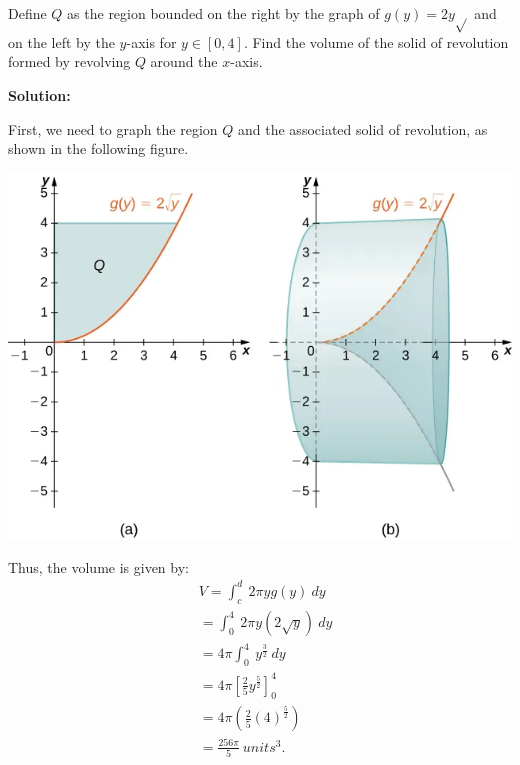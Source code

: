 \documentclass{report}
\begin{document}
  \pagebreak \bigbreak \noindent 
  \begin{eg}
     Define \( Q \) as the region bounded on the right by the graph of \( g(y) = 2y\sqrt{} \) and on the left by the \( y \)-axis for \( y \in [0, 4] \). Find the volume of the solid of revolution formed by revolving \( Q \) around the \( x \)-axis.
  \end{eg}
  \bigbreak \noindent 
  \textbf{Solution:}
  \bigbreak \noindent 
  \begin{minipage}[]{0.47\textwidth}
      First, we need to graph the region $Q$ and the associated solid of revolution, as shown in the following figure.
      \bigbreak \noindent 
      \begin{center}
          \includegraphics[scale=0.4]{./figures/graph30.png}
      \end{center}
  \end{minipage}
  \begin{minipage}[]{0.47\textwidth}
    Thus, the volume is given by:
    \begin{align*}
        &V = \int_{c}^{d}\ 2\pi yg(y)\ dy \\
        &= \int_{0}^{4}\ 2\pi y \left(2\sqrt{y}\right)\ dy \\
        &= 4\pi \int_{0}^{4}\ y^{\frac{3}{2}}\ dy \\
        &= 4\pi \left[\frac{2}{5}y^{\frac{5}{2}}\right]_0^{4}  \\
        &= 4\pi \left(\frac{2}{5}(4)^{\frac{5}{2}}\right) \\
        &=\frac{256\pi}{5}\ units^{3}
    .\end{align*}
  \end{minipage}
\end{document}
